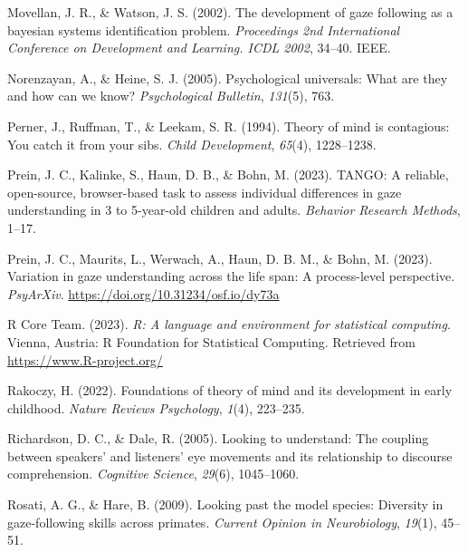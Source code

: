 \documentclass[
  man,floatsintext]{apa6}
\newlength{\cslhangindent}
\newlength{\cslentryspacingunit} %
\newenvironment{CSLReferences}[2] %
 {%
  \setlength{\parindent}{0pt}
  \ifodd #1
  \let\oldpar\par
  \def\par{\hangindent=\cslhangindent\oldpar}
  \fi
  \setlength{\parskip}{#2\cslentryspacingunit}
 }%
 {}
\begin{document}
\begin{CSLReferences}{1}{0}
\leavevmode{}%
Movellan, J. R., \& Watson, J. S. (2002). The development of gaze following as a bayesian systems identification problem. \emph{Proceedings 2nd International Conference on Development and Learning. ICDL 2002}, 34--40. IEEE.

\leavevmode{}%
Norenzayan, A., \& Heine, S. J. (2005). Psychological universals: What are they and how can we know? \emph{Psychological Bulletin}, \emph{131}(5), 763.

\leavevmode{}%
Perner, J., Ruffman, T., \& Leekam, S. R. (1994). Theory of mind is contagious: You catch it from your sibs. \emph{Child Development}, \emph{65}(4), 1228--1238.

\leavevmode{}%
Prein, J. C., Kalinke, S., Haun, D. B., \& Bohn, M. (2023). TANGO: A reliable, open-source, browser-based task to assess individual differences in gaze understanding in 3 to 5-year-old children and adults. \emph{Behavior Research Methods}, 1--17.

\leavevmode{}%
Prein, J. C., Maurits, L., Werwach, A., Haun, D. B. M., \& Bohn, M. (2023). Variation in gaze understanding across the life span: {A} process-level perspective. \emph{{PsyArXiv}}. \url{https://doi.org/10.31234/osf.io/dy73a}

\leavevmode{}%
R Core Team. (2023). \emph{R: A language and environment for statistical computing}. Vienna, Austria: R Foundation for Statistical Computing. Retrieved from \url{https://www.R-project.org/}

\leavevmode{}%
Rakoczy, H. (2022). Foundations of theory of mind and its development in early childhood. \emph{Nature Reviews Psychology}, \emph{1}(4), 223--235.

\leavevmode{}%
Richardson, D. C., \& Dale, R. (2005). Looking to understand: The coupling between speakers' and listeners' eye movements and its relationship to discourse comprehension. \emph{Cognitive Science}, \emph{29}(6), 1045--1060.

\leavevmode{}%
Rosati, A. G., \& Hare, B. (2009). Looking past the model species: Diversity in gaze-following skills across primates. \emph{Current Opinion in Neurobiology}, \emph{19}(1), 45--51.


\end{CSLReferences}
\end{document}
